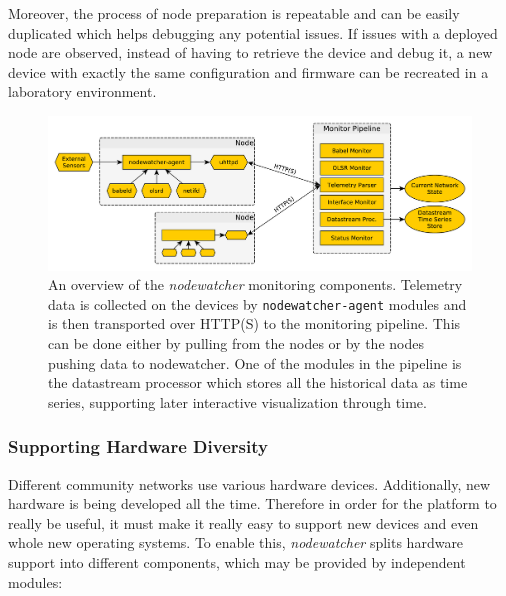 \documentclass[5p,sort&compress]{elsarticle}
\newcommand{\nodewatcher}{\textit{nodewatcher}}
\begin{document}
Moreover, the process of node preparation is repeatable and can be easily duplicated which helps debugging any potential issues.
If issues with a deployed node are observed, instead of having to retrieve the device and debug it, a new device with exactly the same configuration and firmware can be recreated in a laboratory environment.

\begin{figure}
  \centering
  \includegraphics[scale=0.5]{figures/monitoring-pipeline.pdf}
  \caption{An overview of the \nodewatcher{} monitoring components. Telemetry data is collected on the devices by \texttt{nodewatcher-agent} modules and is then transported over HTTP(S) to the monitoring pipeline. This can be done either by pulling from the nodes or by the nodes pushing data to nodewatcher. One of the modules in the pipeline is the datastream processor which stores all the historical data as time series, supporting later interactive visualization through time.}
  \label{fig:monitoring-pipeline}
\end{figure}

\subsubsection{Supporting Hardware Diversity}

Different community networks use various hardware devices.
Additionally, new hardware is being developed all the time.
Therefore in order for the platform to really be useful, it must make it really easy to support new devices and even whole new operating systems.
To enable this, \nodewatcher{} splits hardware support into different components, which may be provided by independent modules:
\end{document}
